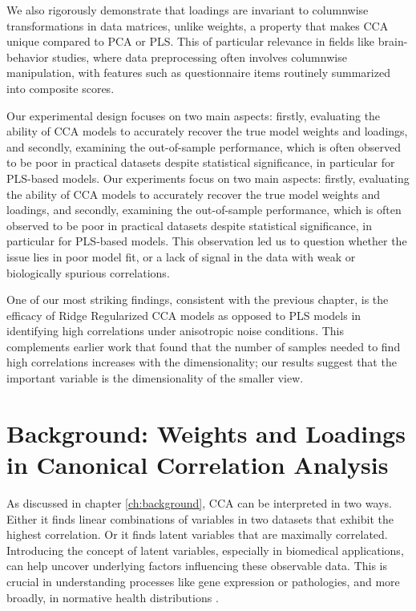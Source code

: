 We also rigorously demonstrate that loadings are invariant to columnwise transformations in data matrices, unlike weights, a property that makes CCA unique compared to PCA or PLS\@.
This of particular relevance in fields like brain-behavior studies, where data preprocessing often involves columnwise manipulation, with features such as questionnaire items routinely summarized into composite scores.

Our experimental design focuses on two main aspects: firstly, evaluating the ability of CCA models to accurately recover the true model weights and loadings, and secondly, examining the out-of-sample performance, which is often observed to be poor in practical datasets despite statistical significance, in particular for PLS-based models.
Our experiments focus on two main aspects: firstly, evaluating the ability of CCA models to accurately recover the true model weights and loadings, and secondly, examining the out-of-sample performance, which is often observed to be poor in practical datasets despite statistical significance, in particular for PLS-based models.
This observation led us to question whether the issue lies in poor model fit, or a lack of signal in the data with weak or biologically spurious correlations.

One of our most striking findings, consistent with the previous chapter, is the efficacy of Ridge Regularized CCA models as opposed to PLS models in identifying high correlations under anisotropic noise conditions.
This complements earlier work \citep{helmer2020stability} that found that the number of samples needed to find high correlations increases with the dimensionality; our results suggest that the important variable is the dimensionality of the smaller view.

\section{Background: Weights and Loadings in Canonical Correlation Analysis}

As discussed in chapter \ref{ch:background}, CCA can be interpreted in two ways.
Either it finds linear combinations of variables in two datasets that exhibit the highest correlation.
Or it finds latent variables that are maximally correlated.
Introducing the concept of latent variables, especially in biomedical applications, can help uncover underlying factors influencing these observable data.
This is crucial in understanding processes like gene expression or pathologies, and more broadly, in normative health distributions \citep{lawry2023multi}.

